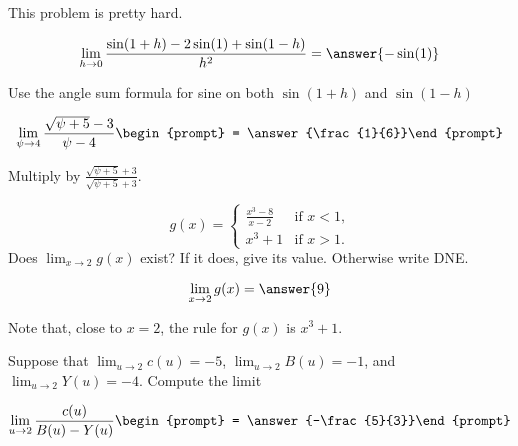 \documentclass[handout]{ximera}
\begin{document}
\begin{exercise}
	\begin{warning}
		This problem is pretty hard.
	\end{warning}
	\[\lim_{h \to 0} \frac{\sin(1+h) - 2\sin(1)+\sin(1-h)}{h^2} = \answer{-\sin(1)}\]
	\begin{hint}
		Use the angle sum formula for sine on both $\sin(1+h)$ and $\sin(1-h)$
	\end{hint}
\end{exercise}

\begin{exercise}
\[
\lim_{\psi\to 4 } \frac{\sqrt{\psi +5}-3}{\psi -4}\begin{prompt} = \answer{\frac{1}{6}}\end{prompt}
\]
\begin{hint}
Multiply by $\frac{\sqrt{\psi +5}+3}{\sqrt{\psi +5}+3}$.
\end{hint}
\end{exercise}

\begin{exercise}
\[
g(x) = \begin{cases}
  \frac{x^3 - 8}{x-2}  &\text{if $x<1$,} \\
  x^3+1 &\text{if  $x>1$.}
\end{cases}
\]
Does $\lim_{x \to 2} g(x)$ exist?  If it does, give its value.
Otherwise write DNE.
\begin{prompt}
\[
\lim_{x \to 2} g(x) = \answer{9}
\]
\end{prompt}
\begin{hint}
	Note that, close to $x=2$, the rule for $g(x)$ is $x^3+1$.
\end{hint}

\end{exercise}

\begin{exercise}
Suppose that $\displaystyle\lim_{u\to2}c(u)=-5$, $\displaystyle\lim_{u\to2}B(u)=-1$, and $\displaystyle\lim_{u\to2}Y(u)=-4$. Compute the limit

\[
\lim_{u\to 2 } \frac{c(u)}{B(u)-Y(u)}\begin{prompt} = \answer{-\frac{5}{3}}\end{prompt}
\]
\end{exercise}
\end{document}

